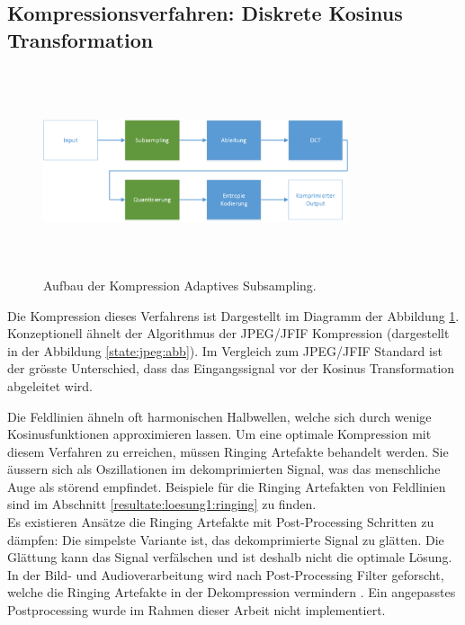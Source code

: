 \subsection{Kompressionsverfahren: Diskrete Kosinus Transformation}\label{konzept:loesung1}
\begin{figure}[!htbp]
	\center
	\includegraphics[width=0.8\textwidth,height=6cm,keepaspectratio]{./pictures/konzept/solution1/aufbau.png}
	\caption{Aufbau der Kompression Adaptives Subsampling.}
	\label{konzept:loesung1:aufbau}
\end{figure} 
Die Kompression dieses Verfahrens ist Dargestellt im Diagramm der Abbildung \ref{konzept:loesung1:aufbau}. Konzeptionell ähnelt der Algorithmus der JPEG/JFIF Kompression (dargestellt in der Abbildung \ref{state:jpeg:abb}). Im Vergleich zum JPEG/JFIF Standard ist der grösste Unterschied, dass das Eingangssignal vor der Kosinus Transformation abgeleitet wird.

Die Feldlinien ähneln oft harmonischen Halbwellen, welche sich durch wenige Kosinusfunktionen approximieren lassen. Um eine optimale Kompression mit diesem Verfahren zu erreichen, müssen Ringing Artefakte \cite{wiki:ringing:artefacts} behandelt werden. Sie äussern sich als Oszillationen im dekomprimierten Signal, was das menschliche Auge als störend empfindet. Beispiele für die Ringing Artefakten von Feldlinien sind im Abschnitt \ref{resultate:loesung1:ringing} zu finden.\\
Es existieren Ansätze die Ringing Artefakte mit Post-Processing Schritten zu dämpfen: Die simpelste Variante ist, das dekomprimierte Signal zu glätten. Die Glättung kann das Signal verfälschen und ist deshalb nicht die optimale Lösung. In der Bild- und Audioverarbeitung wird nach Post-Processing Filter geforscht, welche die Ringing Artefakte in der Dekompression vermindern \cite{kaup1998reduction} \cite{park1999postprocessing}. Ein angepasstes Postprocessing wurde im Rahmen dieser Arbeit nicht implementiert.


